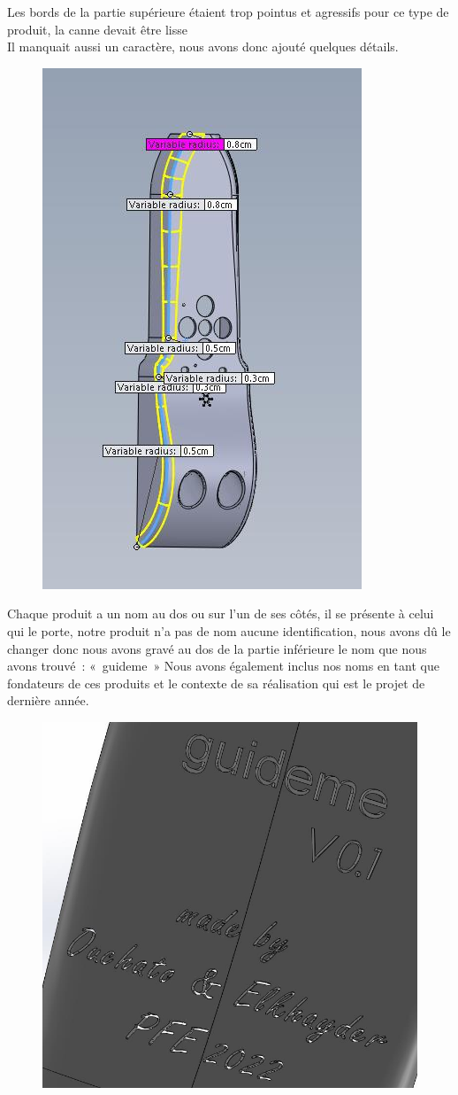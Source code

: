 \FloatBarrier

Les bords de la partie supérieure étaient trop pointus et agressifs pour ce type de produit, la canne devait être lisse \\
Il manquait aussi un caractère, nous avons donc ajouté quelques détails.

\begin{figure}[!htbp]
    \centering
    \includegraphics[width=.5\linewidth]{assets/conception1/img338.jpg}
\end{figure}

\FloatBarrier

Chaque produit a un nom au dos ou sur l’un de ses côtés, il se présente à celui qui le porte, notre produit n’a pas de nom aucune identification, nous avons dû le changer donc nous avons gravé au dos de la partie inférieure le nom que nous avons trouvé : « guideme »
Nous avons également inclus nos noms en tant que fondateurs de ces produits et le contexte de sa réalisation qui est le projet de dernière année.

\begin{figure}[!htbp]
    \centering
    \includegraphics[width=.8\linewidth]{assets/conception1/img342.jpg}
\end{figure}

